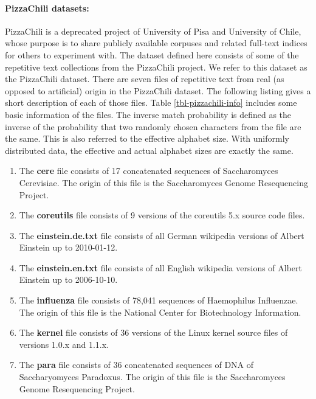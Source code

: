 \documentclass[english,twoside,censored,csm,algorithms-track-2020]{HYthesisML}
\theoremstyle{plain}
\theoremstyle{definition}
\numberwithin{testexample}{chapter}
\begin{document}
\paragraph{PizzaChili datasets:}
PizzaChili \citep{PizzaChili} is a deprecated project of University of Pisa and University of Chile,
whose purpose is to
share publicly available corpuses and related full-text indices for others to experiment with.
The dataset defined here consists of some of the repetitive text collections from the PizzaChili project.
We refer to this dataset as the PizzaChili dataset.
There are seven files of repetitive text from real (as opposed to artificial) origin in the
PizzaChili dataset. The following listing gives a short description of each of those files. Table \ref{tbl-pizzachili-info}
includes some basic information of the files. The inverse match probability is defined
as the inverse of the probability that two randomly chosen characters from the file are the same. This
is also referred to the effective alphabet size. With uniformly distributed data, the effective and
actual alphabet sizes are exactly the same.

\begin{enumerate}
\item The \textbf{cere} file consists of 17 concatenated sequences of Saccharomyces Cerevisiae. The origin of this file is the Saccharomyces Genome Resequencing Project.
\item The \textbf{coreutils} file consists of 9 versions of the coreutils 5.x source code files.
\item The \textbf{einstein.de.txt} file consists of all German wikipedia versions of Albert Einstein up to 2010-01-12.
\item  The \textbf{einstein.en.txt} file consists of all English wikipedia versions of Albert Einstein up to 2006-10-10.
\item The \textbf{influenza} file consists of 78,041 sequences of Haemophilus Influenzae. The origin of this file is the National Center for Biotechnology Information.
\item The \textbf{kernel} file consists of 36 versions of the Linux kernel source files of versions 1.0.x and 1.1.x.
\item The \textbf{para} file consists of 36 concatenated sequences of DNA of Saccharyomyces Paradoxus. The origin of this file is the Saccharomyces Genome Resequencing Project.
\end{enumerate}
\end{document}
